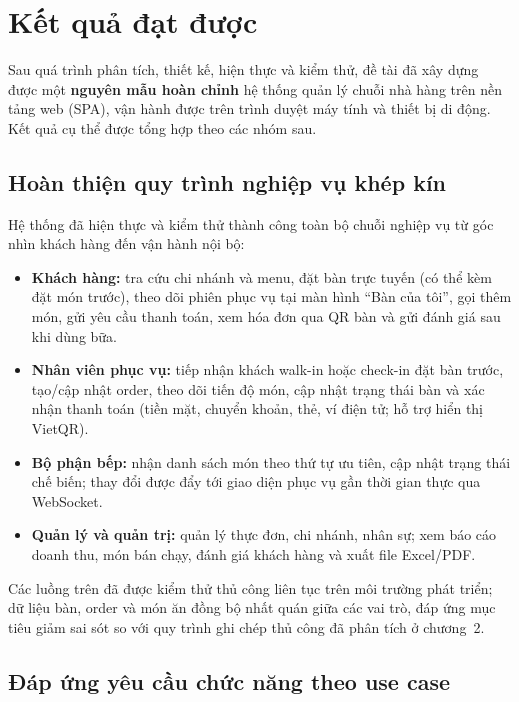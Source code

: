 \documentclass[../DoAn.tex]{subfiles}
\begin{document}
\section{Kết quả đạt được}
\label{section:5.1}

Sau quá trình phân tích, thiết kế, hiện thực và kiểm thử, đề tài đã xây dựng được một \textbf{nguyên mẫu hoàn chỉnh} hệ thống quản lý chuỗi nhà hàng trên nền tảng web (SPA), vận hành được trên trình duyệt máy tính và thiết bị di động. Kết quả cụ thể được tổng hợp theo các nhóm sau.

\subsection{Hoàn thiện quy trình nghiệp vụ khép kín}

Hệ thống đã hiện thực và kiểm thử thành công toàn bộ chuỗi nghiệp vụ từ góc nhìn khách hàng đến vận hành nội bộ:

\begin{itemize}
    \item \textbf{Khách hàng:} tra cứu chi nhánh và menu, đặt bàn trực tuyến (có thể kèm đặt món trước), theo dõi phiên phục vụ tại màn hình ``Bàn của tôi'', gọi thêm món, gửi yêu cầu thanh toán, xem hóa đơn qua QR bàn và gửi đánh giá sau khi dùng bữa.
    \item \textbf{Nhân viên phục vụ:} tiếp nhận khách walk-in hoặc check-in đặt bàn trước, tạo/cập nhật order, theo dõi tiến độ món, cập nhật trạng thái bàn và xác nhận thanh toán (tiền mặt, chuyển khoản, thẻ, ví điện tử; hỗ trợ hiển thị VietQR).
    \item \textbf{Bộ phận bếp:} nhận danh sách món theo thứ tự ưu tiên, cập nhật trạng thái chế biến; thay đổi được đẩy tới giao diện phục vụ gần thời gian thực qua WebSocket.
    \item \textbf{Quản lý và quản trị:} quản lý thực đơn, chi nhánh, nhân sự; xem báo cáo doanh thu, món bán chạy, đánh giá khách hàng và xuất file Excel/PDF.
\end{itemize}

Các luồng trên đã được kiểm thử thủ công liên tục trên môi trường phát triển; dữ liệu bàn, order và món ăn đồng bộ nhất quán giữa các vai trò, đáp ứng mục tiêu giảm sai sót so với quy trình ghi chép thủ công đã phân tích ở chương~2.

\subsection{Đáp ứng yêu cầu chức năng theo use case}
\end{document}
